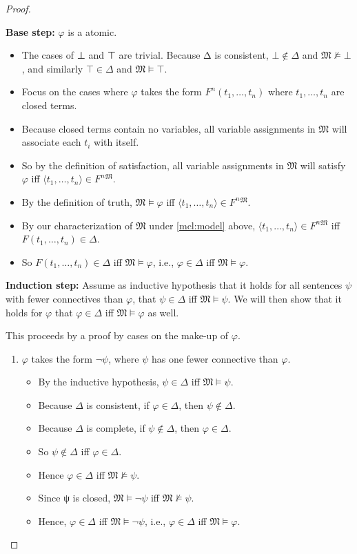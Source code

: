 \documentclass[12pt]{report}
\theoremstyle{nonumberplain}
\newtheorem{proof}{Proof}
\newcommand{\M}{\mathfrak{M}}
\begin{document}
\begin{proof}
\begin{enumerate}
\textbf{Base step:} $φ$ is a atomic.
\begin{itemize}[nolistsep]
\item The cases of ⊥ and ⊤ are trivial. Because Δ is consistent, $⊥ ∉ Δ$ and $\M ⊭ ⊥$, and similarly $⊤ ∈ Δ$ and $\M ⊨ ⊤$.
\item Focus on the cases where $φ$ takes the form $F^n(t_1, \dotsc , t_n)$ where $t_1, \dotsc , t_n$ are closed terms.
\item Because closed terms contain no variables, all variable assignments in $\M$ will associate each $t_i$ with itself.
\item So by the definition of satisfaction, all variable assignments in $\M$ will satisfy $φ$ iff $⟨t_1, \dotsc , t_n⟩∈F^n{}^{\M}$.
\item By the definition of truth, $\M ⊨ φ$ iff $⟨t_1, \dotsc , t_n⟩∈F^{n}{}^{\M}$.
\item By our characterization of $\M$ under \ref{mcl:model} above, $⟨t_1, \dotsc , t_n⟩∈F^n{}^{\M}$ iff $F(t_1, \dotsc , t_n) ∈Δ$.
\item So $F(t_1, \dotsc , t_n) ∈ Δ$ iff $\M ⊨ φ$, i.e., $φ ∈Δ$ iff $\M ⊨ φ$.
\end{itemize}

\smallskip

\textbf{Induction step:} Assume as inductive hypothesis that it holds for all sentences $ψ$ with fewer connectives than $φ$, that $ψ ∈Δ$ iff
$\M ⊨ ψ$. We will then show that it holds for $φ$ that $φ ∈Δ$ iff $\M ⊨ φ$ as well.

This proceeds by a proof by cases on the make-up of $φ$.

\begin{enumerate}[label={Case (\alph*):}]
\item $φ$ takes the form $¬ψ$, where $ψ$ has one fewer connective than $φ$.
\begin{itemize}[nolistsep,leftmargin=*]
\item By the inductive hypothesis, $ψ ∈Δ$ iff $\M ⊨ ψ$.
\item Because $Δ$ is consistent, if $φ ∈Δ$, then $ψ ∉ Δ$.
\item Because $Δ$ is complete, if $ψ ∉ Δ$, then $φ ∈Δ$.
\item So $ψ ∉ Δ$ iff $φ ∈Δ$.
\item Hence $φ ∈Δ$ iff $\M ⊭ ψ$.
\item Since ψ is closed, $\M ⊨ ¬ψ$ iff $\M ⊭ ψ$.
\item Hence, $φ ∈Δ$ iff $\M ⊨ ¬ψ$, i.e., $φ ∈Δ$ iff $\M ⊨ φ$.
\end{itemize}


\end{enumerate}
\end{enumerate}
\end{proof}
\end{document}
